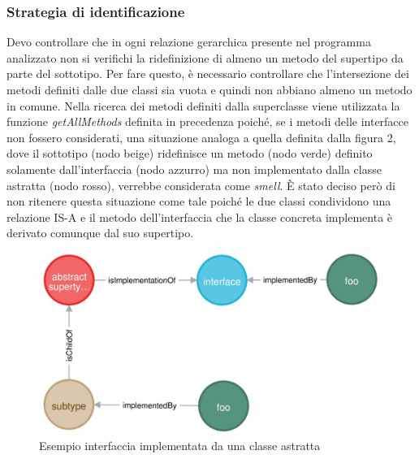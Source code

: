     \subsubsection{Strategia di identificazione}
        Devo controllare che in ogni relazione gerarchica presente nel programma analizzato non si verifichi la ridefinizione di almeno un metodo del supertipo da parte del sottotipo. Per fare questo, è necessario controllare che l'intersezione dei metodi definiti dalle due classi sia vuota e quindi non abbiano almeno un metodo in comune. 
        Nella ricerca dei metodi definiti dalla superclasse viene utilizzata la funzione \textit{getAllMethods} definita in precedenza poiché, se i metodi delle interfacce non fossero considerati, una situazione analoga a quella definita dalla figura 2, dove il sottotipo (nodo beige) ridefinisce un metodo (nodo verde) definito solamente dall'interfaccia (nodo azzurro) ma non implementato dalla classe astratta (nodo rosso), verrebbe considerata come \textit{smell}. È stato deciso però di non ritenere questa situazione come tale poiché le due classi condividono una relazione IS-A e il metodo dell'interfaccia che la classe concreta implementa è derivato comunque dal suo supertipo.
        \begin{figure}[h]
            \centering
            \includegraphics[scale=0.5]{Tesi/Sezione3-RiconoscimentoSmell/immagini/grafo1.JPG}
            \caption{Esempio interfaccia implementata da una classe astratta}
            \label{fig:my_label}
        \end{figure}
         \\
